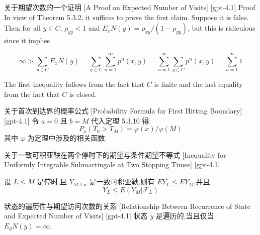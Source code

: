 \documentclass[UTF8]{ctexart}
\begin{document}
    
    
    \begin{prf}
        {关于期望次数的一个证明}
        [A Proof on Expected Number of Visits]
        [gpt-4.1]
        Proof In view of Theorem 5.3.2, it suffices to prove the first claim. Suppose it is false. Then for all $y \in C$, $\rho_{yy} < 1$ and $E_x N(y) = \rho_{xy} / (1 - \rho_{yy})$, but this is ridiculous since it implies

\[
\infty > \sum_{y \in C} E_x N(y) = \sum_{y \in C} \sum_{n=1}^{\infty} p^{n}(x, y) = \sum_{n=1}^{\infty} \sum_{y \in C} p^{n}(x, y) = \sum_{n=1}^{\infty} 1
\]

The first inequality follows from the fact that $C$ is finite and the last equality from the fact that $C$ is closed.

    \end{prf}
    
    
    
    \begin{thm}
        {关于首次到达界的概率公式}
        [Probability Formula for First Hitting Boundary]
        [gpt-4.1]
        令 $a = 0$ 且 $b = M$ 代入定理 5.3.10 得:
\[
P_x(T_0 > T_M) = \varphi(x)/\varphi(M)
\]
其中 $\varphi$ 为定理中涉及的相关函数.
    \end{thm}
    
    
    
    \begin{thm}
        {关于一致可积亚鞅在两个停时下的期望与条件期望不等式}
        [Inequality for Uniformly Integrable Submartingale at Two Stopping Times]
        [gpt-4.1]
        
设 $L \leq M$ 是停时,且 $Y_{M \wedge n}$ 是一致可积亚鞅,则有 $E Y_L \leq E Y_M$,并且
\[
Y_L \le E(Y_M | \mathcal{F}_L)
\]

    \end{thm}
    
    
    
    \begin{thm}
        {状态的遍历性与期望访问次数的关系}
        [Relationship Between Recurrence of State and Expected Number of Visits]
        [gpt-4.1]
        状态 $y$ 是遍历的,当且仅当 $E_{y} N(y) = \infty$.
    \end{thm}
    
\end{document}
